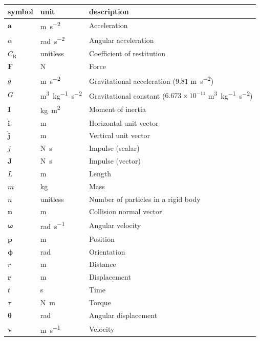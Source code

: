 \documentclass[12pt]{article}
\begin{document}
\renewcommand{\arraystretch}{1.2}
\noindent \begin{longtable}{l l p{12cm}} \toprule
  \textbf{symbol} & \textbf{unit} & \textbf{description}\\
  \midrule 
  $\mathbf{a}$ & \si{\metre\per\second\tothe{2}} & Acceleration \\
  $\alpha$ & \si{\radian\per\second\tothe{2}} & Angular acceleration \\
  $C_\text{R}$ & unitless & Coefficient of restitution \\
  $\mathbf{F}$ & \si{\newton} & Force \\
  $g$ & \si{\metre\per\second\tothe{2}} & Gravitational acceleration ($9.81$ \si{\metre\per\second\tothe{2}}) \\
  $G$ & \si{\metre\tothe{3}\per\kilogram\second\tothe{-2}} & Gravitational constant ($6.673 \times 10^{-11}$ \si{\metre\tothe{3}\per\kilogram\second\tothe{-2}}) \\
  $\mathbf{I}$ & \si{\kilogram\metre\tothe{2}} & Moment of inertia \\
  $\mathbf{\hat{i}}$ & \si{\metre} & Horizontal unit vector \\
  $\mathbf{\hat{j}}$ & \si{\metre} & Vertical unit vector \\
  $j$ & \si{\newton\second} & Impulse (scalar) \\
  $\mathbf{J}$ & \si{\newton\second} & Impulse (vector) \\
  $L$ & \si{\metre} & Length \\
  $m$ & \si{\kilogram} & Mass \\
  $n$ & unitless & Number of particles in a rigid body \\
  $\mathbf{n}$ & \si{\metre} & Collision normal vector \\
  $\boldsymbol{\omega}$ & \si{\radian\per\second} & Angular velocity \\
  $\mathbf{p}$ & \si{\metre} & Position \\
  $\boldsymbol{\phi}$ & \si{\radian} & Orientation \\
  $r$ & \si{\metre} & Distance \\
  $\mathbf{r}$ & \si{\metre} & Displacement \\
  $t$ & \si{\second} & Time \\
  $\tau$ & \si{\newton\metre} & Torque \\
  $\boldsymbol{\theta}$ & \si{\radian} & Angular displacement \\
  $\mathbf{v}$ & \si{\metre\per\second} & Velocity \\
  \bottomrule
\end{longtable}
\end{document}
